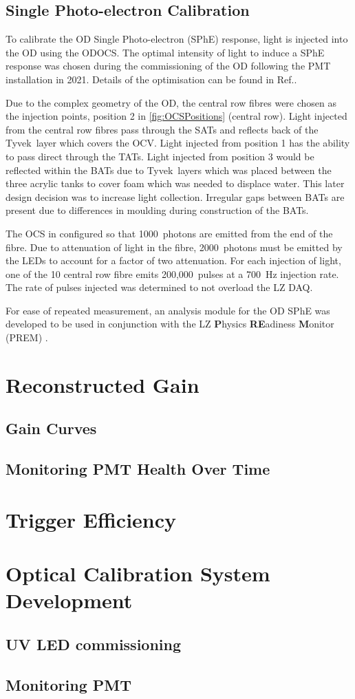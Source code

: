\subsection{Single Photo-electron Calibration}
To calibrate the OD Single Photo-electron (SPhE) response, light is injected into the OD using the ODOCS. The optimal intensity of light to induce a SPhE response was chosen during the commissioning of the OD following the PMT installation in 2021. Details of the optimisation can be found in Ref.\cite{edfraser:thesis}.

Due to the complex geometry of the OD, the central row fibres were chosen as the injection points, position 2 in \autoref{fig:OCSPositions} (central row). Light injected from the central row fibres pass through the SATs and reflects back of the Tyvek\textregistered\ layer which covers the OCV.
Light injected from position 1 has the ability to pass direct through the TATs. Light injected from position 3 would be reflected within the BATs due to Tyvek\textregistered\ layers which was placed between the three acrylic tanks to cover foam which was needed to displace water. This later design decision was to increase light collection. Irregular gaps between BATs are present due to differences in moulding during construction of the BATs.

The OCS in configured so that 1000~photons are emitted from the end of the fibre. Due to attenuation of light in the fibre, 2000~photons must be emitted by the LEDs to account for a factor of two attenuation. For each injection of light, one of the 10 central row fibre emits 200,000~pulses at a 700~Hz injection rate. The rate of pulses injected was determined to not overload the LZ DAQ.

For ease of repeated measurement, an analysis module for the OD SPhE was developed to be used in conjunction with the LZ \textbf{P}hysics \textbf{RE}adiness \textbf{M}onitor (PREM) \cite{LZTDR}.

\section{Reconstructed Gain}
\subsection{Gain Curves}
\subsection{Monitoring PMT Health Over Time}

\section{Trigger Efficiency}

\section{Optical Calibration System Development}
\subsection{UV LED commissioning}

\subsection{Monitoring PMT}